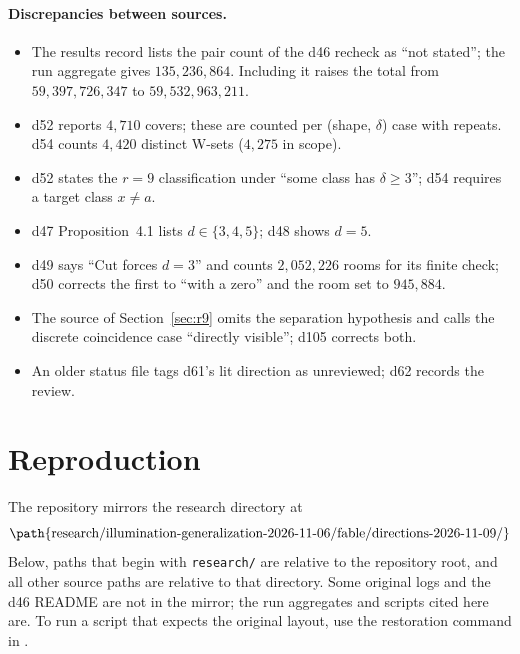 \documentclass[11pt]{article}
\theoremstyle{definition}
\theoremstyle{remark}
\newcommand{\Cut}{\mathrm{Cut}}
\newcommand{\src}[1]{\path{#1}}
\begin{document}
\paragraph{Discrepancies between sources.}
\begin{itemize}
\item The results record lists the pair count of the d46 recheck as ``not
stated''; the run aggregate gives $135{,}236{,}864$. Including it raises the
total from $59{,}397{,}726{,}347$ to $59{,}532{,}963{,}211$.
\item d52 reports $4{,}710$ covers; these are counted per (shape, $\delta$)
case with repeats. d54 counts $4{,}420$ distinct W-sets ($4{,}275$ in scope).
\item d52 states the $r=9$ classification under ``some class has
$\delta\ge 3$''; d54 requires a target class $x\ne a$.
\item d47 Proposition~4.1 lists $d\in\{3,4,5\}$; d48 shows $d=5$.
\item d49 says ``$\Cut$ forces $d=3$'' and counts $2{,}052{,}226$ rooms for
its finite check; d50 corrects the first to ``with a zero'' and the room set to
$945{,}884$.
\item The source of Section~\ref{sec:r9} omits the separation hypothesis and
calls the discrete coincidence case ``directly visible''; d105 corrects both.
\item An older status file tags d61's lit direction as unreviewed; d62
records the review.
\end{itemize}

\section{Reproduction}\label{sec:repro}

The repository mirrors the research directory at
\[\text{\src{research/illumination-generalization-2026-11-06/fable/directions-2026-11-09/}}\]
Below, paths that begin with \texttt{research/} are relative to the
repository root, and all other source paths are relative to that directory.
Some original logs and the d46 README are not in the mirror; the run
aggregates and scripts cited here are. To run a script that expects the
original layout, use the restoration command in \src{docs/REPRODUCIBILITY.md}.
\end{document}
